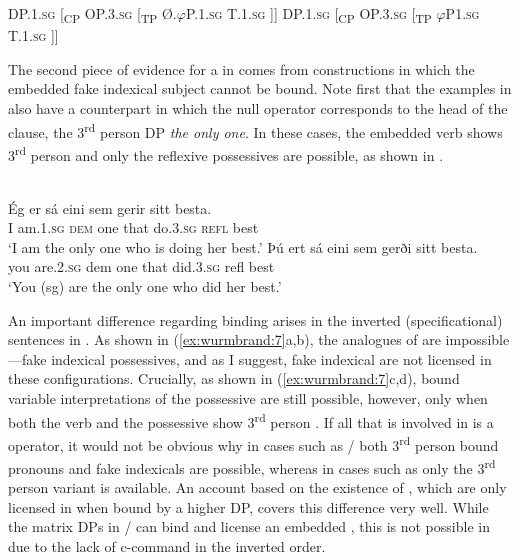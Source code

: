 \documentclass[output=paper]{LSP/langsci}
\begin{document}
\ea\label{ex:wurmbrand:5}
\ea
  DP.1.\textsc{sg}  [\textsubscript{CP}  OP.3.\textsc{sg}  [\textsubscript{TP}  Ø.$\varphi $P.1.\textsc{sg  T.1.sg  ]]}  
\ex 
DP.1.\textsc{sg}  [\textsubscript{CP}  OP.3.\textsc{sg}  [\textsubscript{TP}  $\varphi $P1.\textsc{sg  T.1.sg  ]]} 
\z
\z

The second piece of evidence for a  in  comes from constructions in which the embedded fake indexical subject cannot be bound. Note first that the examples in  also have a counterpart in which the null operator corresponds to the head of the  clause, the 3\textsuperscript{rd} person DP \textit{the only one}. In these cases, the embedded verb shows 3\textsuperscript{rd} person  and only the reflexive possessives are possible, as shown in .

\ea   \label{ex:wurmbrand:6}
\\
\ea 
\gll 
Ég  er  sá  eini  sem  gerir  sitt  besta.\\
I  am.1.\textsc{sg}  \textsc{dem}  one  that  do.3.\textsc{sg}  \textsc{refl}  best\\
\glt  ‘I am the only one who is doing her best.’
\ex
\gll  Þú  ert  sá  eini  sem  gerði  sitt  besta.\\
you  are.2.\textsc{sg}  dem  one  that  did.3.\textsc{sg}  refl  best\\
\glt ‘You (sg) are the only one who did her best.’
\z
\z

An important difference regarding binding arises in the inverted (specificational) sentences in . As shown in (\ref{ex:wurmbrand:7}a,b), the analogues of  are impossible—fake indexical possessives, and as I suggest, fake indexical  are not licensed in these configurations. Crucially, as shown in (\ref{ex:wurmbrand:7}c,d), bound variable interpretations of the possessive are still possible, however, only when both the verb and the possessive show 3\textsuperscript{rd} person . If all that is involved in  is a  operator, it would not be obvious why in cases such as / both 3\textsuperscript{rd} person bound pronouns and fake indexicals are possible, whereas in cases such as  only the 3\textsuperscript{rd} person variant is available. An account based on the existence of , which are only licensed in  when bound by a higher DP, covers this difference very well. While the matrix DPs in / can bind and license an embedded , this is not possible in  due to the lack of c-command in the inverted order.
\end{document}
